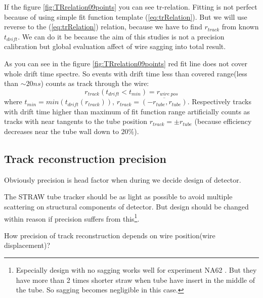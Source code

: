 \documentclass[]{article}
\begin{document}
	If the figure \ref{fig:TRrelation09points} you can see tr-relation. Fitting is not perfect because of using simple fit function template (\ref{eq:trRelation}). But we will use reverse to the (\ref{eq:trRelation}) relation, because we have to find $r_{track}$ from known $t_{drift}$. We can do it be because the aim of this studies is not a precision calibration but global evaluation affect of wire sagging into total result.
	
	As you can see in the figure \ref{fig:TRrelation09points} red fit line does not cover whole drift time spectre. So events with drift time less than covered range(less than $\sim20 ns$) counts as track through the wire:
	\begin{equation}
	r_{track}(t_{drift} < t_{min}) = r_{wire~pos}
	\end{equation}
	where $t_{min} = min (t_{drift}(r_{track}))$, $r_{track} = \overline{(-r_{tube},r_{tube})}$. Respectively tracks with drift time higher than maximum of fit function range artificially counts as tracks with near tangents to the tube position $r_{track} = \pm r_{tube}$  (because efficiency decreases near the tube wall down to $20\%$).
	
	\subsection{Track reconstruction precision}
	
	Obviously precision is head factor when during we decide design of detector.
	
	The STRAW tube tracker should be as light as possible to avoid multiple scattering on structural components of detector. But design should be changed within reason if precision suffers from this\footnote{Especially design with no sagging works well for experiment NA62 \cite{}. But they have more than 2 times shorter  straw when tube have insert in the middle of the tube. So sagging becomes negligible in this case.}.
	
	How precision of track reconstruction depends on wire position(wire displacement)?
	
\end{document}

